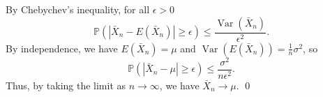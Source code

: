 \documentclass[
]{article}
\theoremstyle{definition}
\begin{document}
By Chebychev's inequality, for all \(\epsilon > 0\)
\[\mathbb{P}(\left|\bar{X}_n - E(\bar{X}_n) \right| \ge \epsilon) \le 
  \frac{\mathop{\mathrm{Var}}(\bar{X}_n)}{\epsilon^2}.\] By
independence, we have \(E(\bar{X}_n) = \mu\) and
\(\mathop{\mathrm{Var}}(E(\bar{X}_n)) = \frac{1}{n}\sigma ^2\), so
\[\mathbb{P}(\left|\bar{X}_n - \mu \right| \ge \epsilon) \le 
  \frac{\sigma^2}{n\epsilon^2}.\] Thus, by taking the limit as
\(n \to \infty\), we have \(\bar{X}_n \to \mu\). \qed
\end{document}
